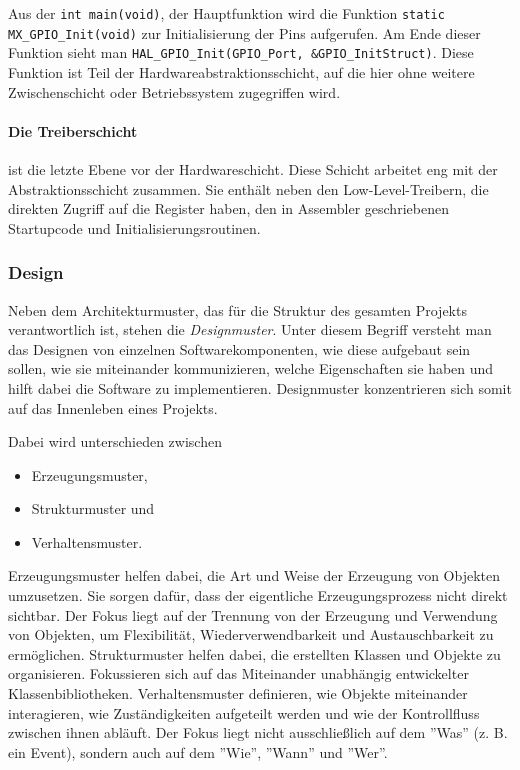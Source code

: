 Aus der \texttt{int main(void)}, der Hauptfunktion wird die Funktion \texttt{static MX\_GPIO\_Init(void)} zur Initialisierung der Pins aufgerufen.
Am Ende dieser Funktion sieht man \texttt{HAL\_GPIO\_Init(GPIO\_Port, \&GPIO\_InitStruct)}.
Diese Funktion ist Teil der Hardwareabstraktionsschicht, auf die hier ohne weitere Zwischenschicht oder Betriebssystem zugegriffen wird.

\paragraph{Die Treiberschicht} 
ist die letzte Ebene vor der Hardwareschicht.
Diese Schicht arbeitet eng mit der Abstraktionsschicht zusammen.
Sie enthält neben den Low-Level-Treibern, die direkten Zugriff auf die Register haben, den in Assembler geschriebenen Startupcode und Initialisierungsroutinen.


\subsubsection{Design}
Neben dem Architekturmuster, das für die Struktur des gesamten Projekts verantwortlich ist, stehen die \emph{Designmuster}.
Unter diesem Begriff versteht man das Designen von einzelnen Softwarekomponenten, wie diese aufgebaut sein sollen, wie sie miteinander kommunizieren, welche Eigenschaften sie haben und hilft dabei die Software zu implementieren.
Designmuster konzentrieren sich somit auf das Innenleben eines Projekts.\cite{gfg_DesignVsArchitecture}

Dabei wird unterschieden zwischen
\begin{itemize}
	\item Erzeugungsmuster,
	\item Strukturmuster und
	\item Verhaltensmuster.
\end{itemize}

Erzeugungsmuster helfen dabei, die Art und Weise der Erzeugung von Objekten umzusetzen.
Sie sorgen dafür, dass der eigentliche Erzeugungsprozess nicht direkt sichtbar.
Der Fokus liegt auf der Trennung von der Erzeugung und Verwendung von Objekten, um Flexibilität, Wiederverwendbarkeit und Austauschbarkeit zu ermöglichen.
Strukturmuster helfen dabei, die erstellten Klassen und Objekte zu organisieren.
Fokussieren sich auf das Miteinander unabhängig entwickelter Klassenbibliotheken.
Verhaltensmuster definieren, wie Objekte miteinander interagieren, wie Zuständigkeiten aufgeteilt werden und wie der Kontrollfluss zwischen ihnen abläuft.
Der Fokus liegt nicht ausschließlich auf dem ''Was'' (z. B. ein Event), sondern auch auf dem ''Wie'', ''Wann'' und ''Wer''.


